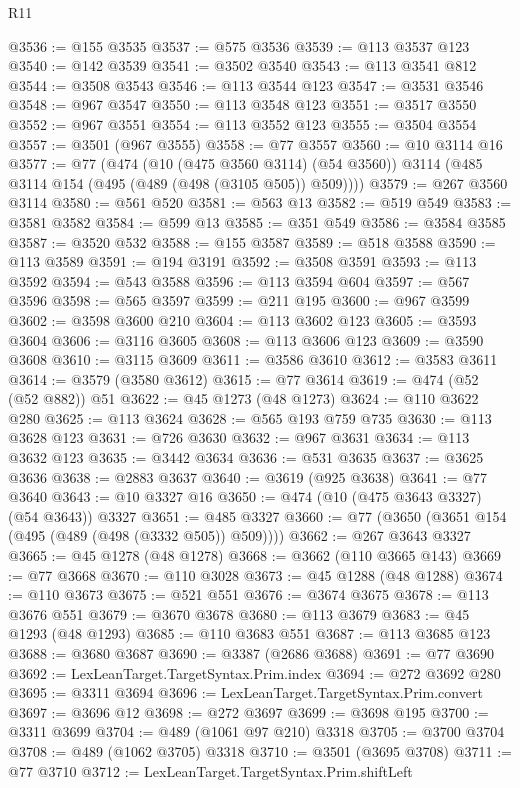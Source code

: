\begin{lexlean}{R11}
\begin{coremodule}
@3536 := @155 @3535
@3537 := @575 @3536
@3539 := @113 @3537 @123
@3540 := @142 @3539
@3541 := @3502 @3540
@3543 := @113 @3541 @812
@3544 := @3508 @3543
@3546 := @113 @3544 @123
@3547 := @3531 @3546
@3548 := @967 @3547
@3550 := @113 @3548 @123
@3551 := @3517 @3550
@3552 := @967 @3551
@3554 := @113 @3552 @123
@3555 := @3504 @3554
@3557 := @3501 (@967 @3555)
@3558 := @77 @3557
@3560 := @10 @3114 @16
@3577 := @77
    (@474
      (@10 (@475 @3560 @3114) (@54 @3560))
      @3114
      (@485 @3114 @154 (@495 (@489 (@498 (@3105 @505)) @509))))
@3579 := @267 @3560 @3114
@3580 := @561 @520
@3581 := @563 @13
@3582 := @519 @549
@3583 := @3581 @3582
@3584 := @599 @13
@3585 := @351 @549
@3586 := @3584 @3585
@3587 := @3520 @532
@3588 := @155 @3587
@3589 := @518 @3588
@3590 := @113 @3589
@3591 := @194 @3191
@3592 := @3508 @3591
@3593 := @113 @3592
@3594 := @543 @3588
@3596 := @113 @3594 @604
@3597 := @567 @3596
@3598 := @565 @3597
@3599 := @211 @195
@3600 := @967 @3599
@3602 := @3598 @3600 @210
@3604 := @113 @3602 @123
@3605 := @3593 @3604
@3606 := @3116 @3605
@3608 := @113 @3606 @123
@3609 := @3590 @3608
@3610 := @3115 @3609
@3611 := @3586 @3610
@3612 := @3583 @3611
@3614 := @3579 (@3580 @3612)
@3615 := @77 @3614
@3619 := @474 (@52 (@52 @882)) @51
@3622 := @45 @1273 (@48 @1273)
@3624 := @110 @3622 @280
@3625 := @113 @3624
@3628 := @565 @193 @759 @735
@3630 := @113 @3628 @123
@3631 := @726 @3630
@3632 := @967 @3631
@3634 := @113 @3632 @123
@3635 := @3442 @3634
@3636 := @531 @3635
@3637 := @3625 @3636
@3638 := @2883 @3637
@3640 := @3619 (@925 @3638)
@3641 := @77 @3640
@3643 := @10 @3327 @16
@3650 := @474 (@10 (@475 @3643 @3327) (@54 @3643)) @3327
@3651 := @485 @3327
@3660 := @77 (@3650 (@3651 @154 (@495 (@489 (@498 (@3332 @505)) @509))))
@3662 := @267 @3643 @3327
@3665 := @45 @1278 (@48 @1278)
@3668 := @3662 (@110 @3665 @143)
@3669 := @77 @3668
@3670 := @110 @3028
@3673 := @45 @1288 (@48 @1288)
@3674 := @110 @3673
@3675 := @521 @551
@3676 := @3674 @3675
@3678 := @113 @3676 @551
@3679 := @3670 @3678
@3680 := @113 @3679
@3683 := @45 @1293 (@48 @1293)
@3685 := @110 @3683 @551
@3687 := @113 @3685 @123
@3688 := @3680 @3687
@3690 := @3387 (@2686 @3688)
@3691 := @77 @3690
@3692 := LexLeanTarget.TargetSyntax.Prim.index
@3694 := @272 @3692 @280
@3695 := @3311 @3694
@3696 := LexLeanTarget.TargetSyntax.Prim.convert
@3697 := @3696 @12
@3698 := @272 @3697
@3699 := @3698 @195
@3700 := @3311 @3699
@3704 := @489 (@1061 @97 @210) @3318
@3705 := @3700 @3704
@3708 := @489 (@1062 @3705) @3318
@3710 := @3501 (@3695 @3708)
@3711 := @77 @3710
@3712 := LexLeanTarget.TargetSyntax.Prim.shiftLeft

\end{coremodule}
\end{lexlean}
